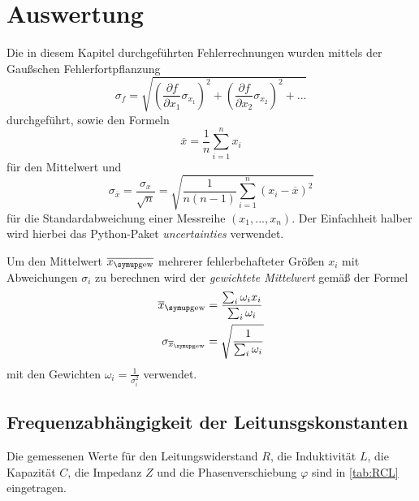 \section{Auswertung}
\label{sec:Auswertung}

Die in diesem Kapitel durchgeführten Fehlerrechnungen wurden mittels der Gaußschen Fehlerfortpflanzung 
\begin{equation}
    \sigma_f = \sqrt{\left( \frac{\partial f}{\partial x_1} \sigma_{x_1} \right)^2 + \left( \frac{\partial f}{\partial x_2} \sigma_{x_2} \right)^2 + ...}
\end{equation}
durchgeführt, sowie den Formeln 
\begin{equation}
    \overline{x} = \frac{1}{n} \sum^n_{i=1}x_i 
    \label{eq:mittelwert}
\end{equation}
für den Mittelwert und 
\begin{equation}
    \sigma_{\overline{x}} = \frac{\sigma_x}{\sqrt{n}} = \sqrt{\frac{1}{n(n-1)}  \sum^n_{i=1} \left( x_i - \overline{x}\right)^2 } 
    \label{eq:standardabweichung}
\end{equation}
für die Standardabweichung einer Messreihe $\left( x_1, ... , x_n  \right)$.
Der Einfachheit halber wird hierbei das Python-Paket \textit{uncertainties} verwendet. \cite{uncertainties} \\
\hspace{1cm}

Um den Mittelwert $\overline{x_\T{gew}}$  mehrerer fehlerbehafteter Größen $x_i$ mit Abweichungen $\sigma_i$ zu berechnen wird der \textit{gewichtete Mittelwert} gemäß der Formel
\begin{align}
    \overline{x}_\T{gew} &= \frac{\sum_i \omega_i x_i}{\sum_i \omega_i} \label{eq:gewichteter_mittelwert} \\
    \sigma_{\overline{x}_\T{gew}} &= \sqrt{\frac{1}{\sum_i \omega_i}} \label{eq:gewichtete_standardabweichung}
\end{align}
mit den Gewichten $\omega_i = \frac{1}{\sigma_i^2}$ verwendet.

\subsection{Frequenzabhängigkeit der Leitunsgskonstanten}

Die gemessenen Werte für den Leitungswiderstand $R$, die Induktivität $L$, die Kapazität $C$, die Impedanz $Z$ und die Phasenverschiebung $\varphi$ sind in \autoref{tab:RCL} eingetragen. 

